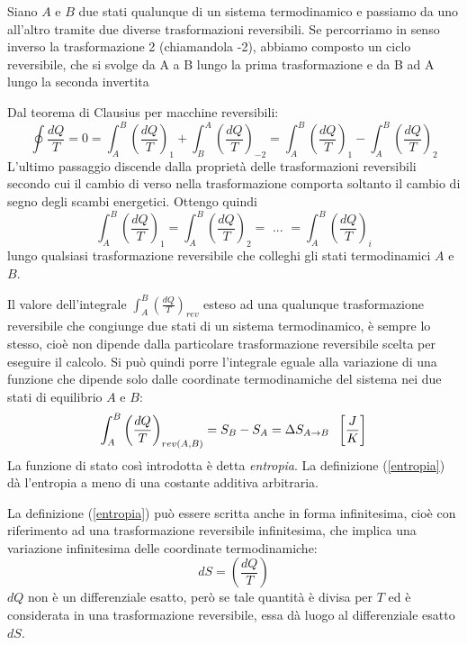 \documentclass[class=book, crop=false, oneside, 12pt]{standalone}
\begin{document}
Siano \(A\) e \(B\) due stati qualunque di un sistema termodinamico e passiamo da uno all'altro tramite due diverse trasformazioni reversibili.
Se percorriamo in senso inverso la trasformazione 2 (chiamandola -2), abbiamo composto un ciclo reversibile, che si svolge da A a B lungo la prima trasformazione e da B ad A lungo la seconda invertita

Dal teorema di Clausius per macchine reversibili:
\begin{equation*}
    \oint \frac{d Q}{T} = 0 = \int_A^B \left(\frac{d Q}{T}\right)_1 + \int_B^A \left(\frac{d Q}{T}\right)_{-2} = \int_A^B \left(\frac{d Q}{T}\right)_1 - \int_A^B \left(\frac{d Q}{T}\right)_{2} 
\end{equation*}
L'ultimo passaggio discende dalla proprietà delle trasformazioni reversibili secondo cui il cambio di verso nella trasformazione comporta soltanto il cambio di segno degli scambi energetici. 
Ottengo quindi
\begin{equation*}
    \int_A^B \left(\frac{d Q}{T}\right)_1 = \int_A^B \left(\frac{d Q}{T}\right)_2 = \text{ ... } = \int_A^B \left(\frac{d Q}{T}\right)_i
\end{equation*}
lungo qualsiasi trasformazione reversibile che colleghi gli stati termodinamici \(A\) e \(B\). 

Il valore dell'integrale \(\int_A^B \left(\frac{d Q}{T}\right)_{rev}\) esteso ad una qualunque trasformazione reversibile che congiunge due stati di un sistema termodinamico, è sempre lo stesso, cioè non dipende dalla particolare trasformazione reversibile scelta per eseguire il calcolo. \newline
Si può quindi porre l'integrale eguale alla variazione di una funzione che dipende solo dalle coordinate termodinamiche del sistema nei due stati di equilibrio \(A\) e \(B\):
\begin{equation} \label{entropia}
    \int_A^B \left(\frac{d Q}{T}\right)_{rev(A, B)} = S_{B} - S_{A} = \Delta S_{A\rightarrow B} \hspace{0.2cm} \left[\frac{J}{K}\right]
\end{equation}
La funzione di stato così introdotta è detta \emph{entropia}.\newline
La definizione (\ref{entropia}) dà l'entropia a meno di una costante additiva arbitraria.

La definizione (\ref{entropia}) può essere scritta anche in forma infinitesima, cioè con riferimento ad una trasformazione reversibile infinitesima, che implica una variazione infinitesima delle coordinate termodinamiche:
\begin{equation} \label{entropia_infinitesima}
    d S = \left(\frac{dQ}{T}\right)
\end{equation}
\(d Q\) non è un differenziale esatto, però se tale quantità è divisa per \(T\) ed è considerata in una trasformazione reversibile, essa dà luogo al differenziale esatto \(d S\).
\end{document}
